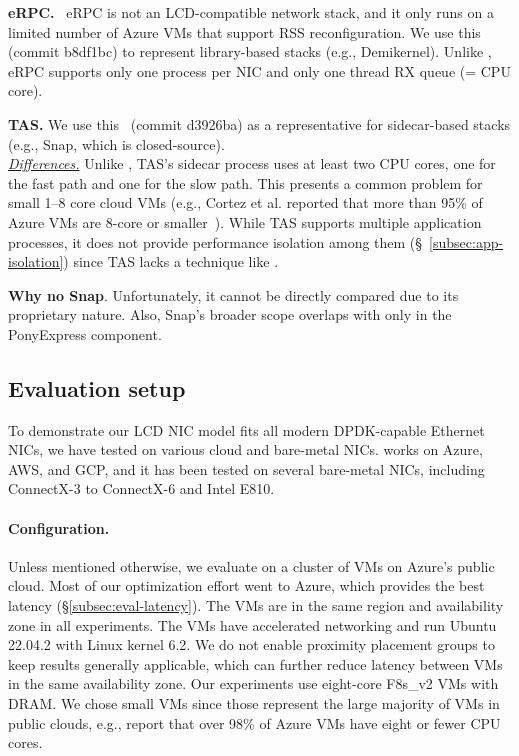 \vspace{0.1cm}
\noindent\textbf{eRPC.}~\cite{erpc} eRPC is not an LCD-compatible network stack, and it only runs on a limited number of Azure VMs that support RSS reconfiguration.
We use this (commit b8df1bc) to represent library-based stacks (e.g., Demikernel).
Unlike \mt{}, eRPC supports only one process per NIC and only one thread RX queue (= CPU core).

\vspace{0.1cm}
\noindent\textbf{TAS.} We use this~\cite{tas} (commit d3926ba) as a representative for sidecar-based stacks (e.g., Snap, which is closed-source).\\
\ul{\textit{Differences.}} Unlike \mt{}, TAS's sidecar process uses at least two CPU cores, one for the fast path and one for the slow path.
This presents a common problem for small 1--8 core cloud VMs (e.g., Cortez et al. reported that more than 95\%  of Azure VMs are 8-core or smaller~\cite{cortez2017resource}).
While TAS supports multiple application processes, it does not provide performance isolation among them (\S~\ref{subsec:app-isolation}) since TAS lacks a technique like \rssminus{}.

\noindent \textbf{Why no Snap}. Unfortunately, it cannot be directly compared due to its proprietary nature. Also, Snap’s broader scope overlaps with \mt{} only in the PonyExpress component. 


\subsection{Evaluation setup}
\label{subsec:mcloud}
To demonstrate our LCD NIC model fits all modern DPDK-capable Ethernet NICs, we have tested \mt{} on various cloud and bare-metal NICs.
\mt{} works on Azure, AWS, and GCP, and it has been tested on several bare-metal NICs, including ConnectX-3 to ConnectX-6 and Intel E810.

\paragraph{Configuration.} Unless mentioned otherwise, we evaluate \mt{} on a cluster of VMs on Azure's public cloud.
Most of our optimization effort went to Azure, which provides the best latency (\S\ref{subsec:eval-latency}).
The VMs are in the same region and availability zone in all experiments.
The VMs have accelerated networking and run Ubuntu 22.04.2 with Linux kernel 6.2.
We do not enable proximity placement groups to keep results generally applicable, which can further reduce latency between VMs in the same availability zone.
Our experiments use eight-core F8s\_v2 VMs with  DRAM.
We chose small VMs since those represent the large majority of VMs in public clouds, e.g., \citet{cortez2017resource} report that over 98\% of Azure VMs have eight or fewer CPU cores.

